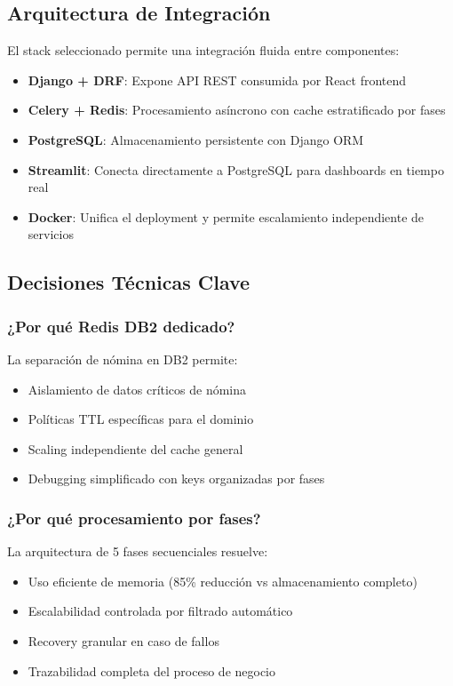 \subsection{Arquitectura de Integración}

El stack seleccionado permite una integración fluida entre componentes:

\begin{itemize}
    \item \textbf{Django + DRF}: Expone API REST consumida por React frontend
    \item \textbf{Celery + Redis}: Procesamiento asíncrono con cache estratificado por fases
    \item \textbf{PostgreSQL}: Almacenamiento persistente con Django ORM
    \item \textbf{Streamlit}: Conecta directamente a PostgreSQL para dashboards en tiempo real
    \item \textbf{Docker}: Unifica el deployment y permite escalamiento independiente de servicios
\end{itemize}

\subsection{Decisiones Técnicas Clave}

\subsubsection{¿Por qué Redis DB2 dedicado?}
La separación de nómina en DB2 permite:
\begin{itemize}
    \item Aislamiento de datos críticos de nómina
    \item Políticas TTL específicas para el dominio
    \item Scaling independiente del cache general
    \item Debugging simplificado con keys organizadas por fases
\end{itemize}

\subsubsection{¿Por qué procesamiento por fases?}
La arquitectura de 5 fases secuenciales resuelve:
\begin{itemize}
    \item Uso eficiente de memoria (85\% reducción vs almacenamiento completo)
    \item Escalabilidad controlada por filtrado automático
    \item Recovery granular en caso de fallos
    \item Trazabilidad completa del proceso de negocio
\end{itemize}

